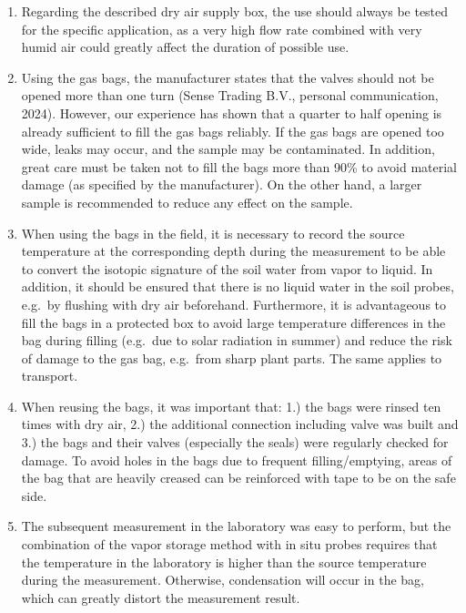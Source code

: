 \documentclass[
  11pt,
  letterpaper,
]{book}
\begin{document}
\begin{enumerate}
\def\labelenumi{\arabic{enumi}.}
\item
  Regarding the described dry air supply box, the use should always be
  tested for the specific application, as a very high flow rate combined
  with very humid air could greatly affect the duration of possible use.
\item
  Using the gas bags, the manufacturer states that the valves should not
  be opened more than one turn (Sense Trading B.V., personal
  communication, 2024). However, our experience has shown that a quarter
  to half opening is already sufficient to fill the gas bags reliably.
  If the gas bags are opened too wide, leaks may occur, and the sample
  may be contaminated. In addition, great care must be taken not to fill
  the bags more than 90\% to avoid material damage (as specified by the
  manufacturer). On the other hand, a larger sample is recommended to
  reduce any effect on the sample.
\item
  When using the bags in the field, it is necessary to record the source
  temperature at the corresponding depth during the measurement to be
  able to convert the isotopic signature of the soil water from vapor to
  liquid. In addition, it should be ensured that there is no liquid
  water in the soil probes, e.g.~by flushing with dry air beforehand.
  Furthermore, it is advantageous to fill the bags in a protected box to
  avoid large temperature differences in the bag during filling
  (e.g.~due to solar radiation in summer) and reduce the risk of damage
  to the gas bag, e.g.~from sharp plant parts. The same applies to
  transport.
\item
  When reusing the bags, it was important that: 1.) the bags were rinsed
  ten times with dry air, 2.) the additional connection including valve
  was built and 3.) the bags and their valves (especially the seals)
  were regularly checked for damage. To avoid holes in the bags due to
  frequent filling/emptying, areas of the bag that are heavily creased
  can be reinforced with tape to be on the safe side.
\item
  The subsequent measurement in the laboratory was easy to perform, but
  the combination of the vapor storage method with in situ probes
  requires that the temperature in the laboratory is higher than the
  source temperature during the measurement. Otherwise, condensation
  will occur in the bag, which can greatly distort the measurement
  result.
\end{enumerate}
\end{document}
